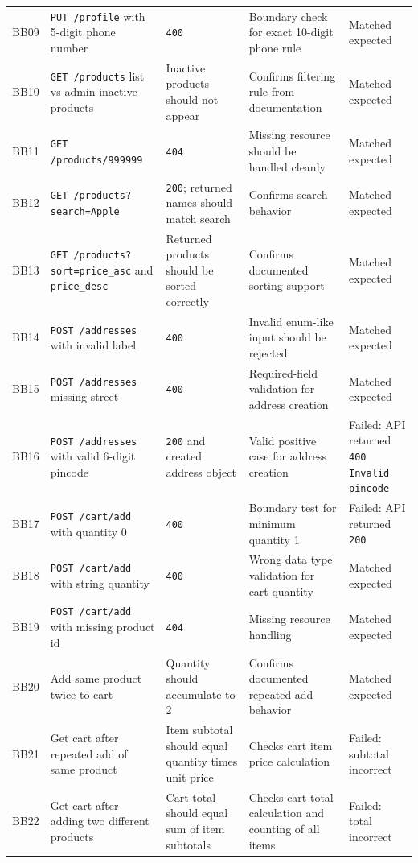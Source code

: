 \documentclass[12pt]{article}
\begin{document}
\begin{longtable}{p{}p{}p{}p{}p{}}
BB09 & \texttt{PUT /profile} with 5-digit phone number & \texttt{400} & Boundary check for exact 10-digit phone rule & Matched expected \\
BB10 & \texttt{GET /products} list vs admin inactive products & Inactive products should not appear & Confirms filtering rule from documentation & Matched expected \\
BB11 & \texttt{GET /products/999999} & \texttt{404} & Missing resource should be handled cleanly & Matched expected \\
BB12 & \texttt{GET /products?search=Apple} & \texttt{200}; returned names should match search & Confirms search behavior & Matched expected \\
BB13 & \texttt{GET /products?sort=price\_asc} and \texttt{price\_desc} & Returned products should be sorted correctly & Confirms documented sorting support & Matched expected \\
BB14 & \texttt{POST /addresses} with invalid label & \texttt{400} & Invalid enum-like input should be rejected & Matched expected \\
BB15 & \texttt{POST /addresses} missing street & \texttt{400} & Required-field validation for address creation & Matched expected \\
BB16 & \texttt{POST /addresses} with valid 6-digit pincode & \texttt{200} and created address object & Valid positive case for address creation & Failed: API returned \texttt{400 Invalid pincode} \\
BB17 & \texttt{POST /cart/add} with quantity 0 & \texttt{400} & Boundary test for minimum quantity 1 & Failed: API returned \texttt{200} \\
BB18 & \texttt{POST /cart/add} with string quantity & \texttt{400} & Wrong data type validation for cart quantity & Matched expected \\
BB19 & \texttt{POST /cart/add} with missing product id & \texttt{404} & Missing resource handling & Matched expected \\
BB20 & Add same product twice to cart & Quantity should accumulate to 2 & Confirms documented repeated-add behavior & Matched expected \\
BB21 & Get cart after repeated add of same product & Item subtotal should equal quantity times unit price & Checks cart item price calculation & Failed: subtotal incorrect \\
BB22 & Get cart after adding two different products & Cart total should equal sum of item subtotals & Checks cart total calculation and counting of all items & Failed: total incorrect \\

\end{longtable}
\end{document}
